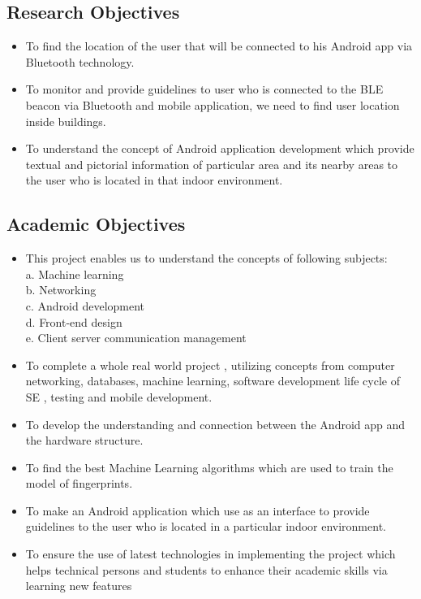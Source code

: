\subsection{Research Objectives}
\begin{itemize}
\item To find the location of the user that will be connected to his Android app via Bluetooth technology\cite{Introduction}.
\item To monitor and provide guidelines to user who is connected to the BLE beacon via Bluetooth and mobile application, we need to find user location inside buildings.
\item To understand the concept of Android application development which provide textual and pictorial information of particular area and its nearby areas to the user who is located in that indoor environment.


\end{itemize}
\subsection{Academic Objectives}
\begin{itemize}
\item This project enables us to understand the concepts of following subjects:
\\a.	Machine learning
\\b.	Networking
\\c.	Android development
\\d.	Front-end design
\\e.	Client server communication management
\item To complete a whole real world project , utilizing concepts from computer networking, databases, machine learning, software development life cycle of SE , testing and mobile development.
\item To develop the understanding and connection between the Android app and the hardware structure. 
\item To find the best Machine Learning algorithms which are used to train the model of fingerprints. 
\item To make an Android application which use as an interface to provide guidelines to the user who is located in a particular indoor environment.
\item To ensure the use of latest technologies in implementing the project which helps technical persons and students to enhance their academic skills via learning new features


\end{itemize}


